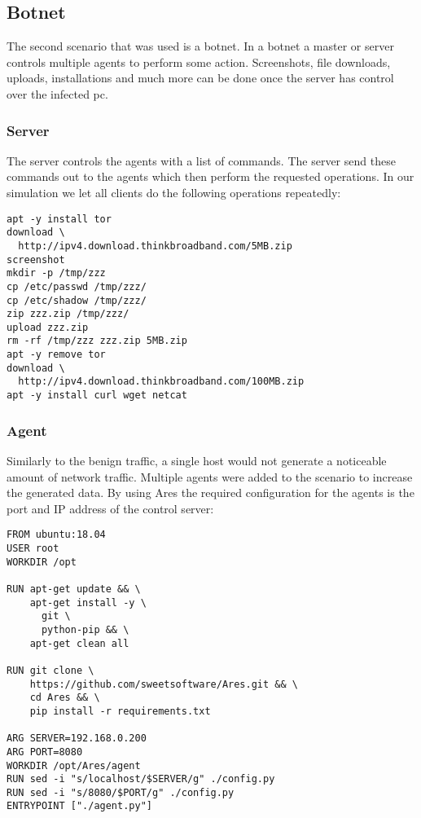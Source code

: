 \documentclass[conference]{IEEEtran}
\begin{document}
\subsection{Botnet}
The second scenario that was used is a botnet. In a botnet a master or server controls multiple agents to perform some action. Screenshots, file downloads, uploads, installations and much more can be done once the server has control over the infected pc. 

\subsubsection{Server}
The server controls the agents with a list of commands. The server send these commands out to the agents which then perform the requested operations. In our simulation we let all clients do the following operations repeatedly:

\begin{lstlisting}[basicstyle=\footnotesize]
apt -y install tor
download \
  http://ipv4.download.thinkbroadband.com/5MB.zip
screenshot
mkdir -p /tmp/zzz
cp /etc/passwd /tmp/zzz/
cp /etc/shadow /tmp/zzz/
zip zzz.zip /tmp/zzz/
upload zzz.zip
rm -rf /tmp/zzz zzz.zip 5MB.zip
apt -y remove tor
download \
  http://ipv4.download.thinkbroadband.com/100MB.zip
apt -y install curl wget netcat

\end{lstlisting}

\subsubsection{Agent}
Similarly to the benign traffic, a single host would not generate a noticeable amount of network traffic. Multiple agents were added to the scenario to increase the generated data. By using Ares the required configuration for the agents is the port and IP address of the control server:

\begin{lstlisting}[basicstyle=\footnotesize]
FROM ubuntu:18.04
USER root
WORKDIR /opt

RUN apt-get update && \
    apt-get install -y \
      git \
      python-pip && \
    apt-get clean all

RUN git clone \ 
    https://github.com/sweetsoftware/Ares.git && \
    cd Ares && \
    pip install -r requirements.txt

ARG SERVER=192.168.0.200
ARG PORT=8080
WORKDIR /opt/Ares/agent
RUN sed -i "s/localhost/$SERVER/g" ./config.py
RUN sed -i "s/8080/$PORT/g" ./config.py
ENTRYPOINT ["./agent.py"]
\end{lstlisting}
\end{document}
